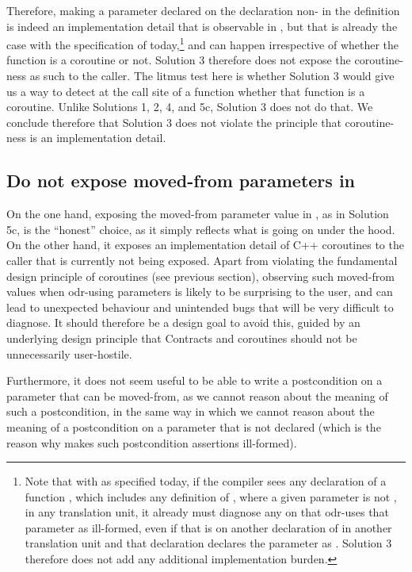 Therefore, making a parameter declared  on the declaration non- in the definition is indeed an implementation detail that is observable in , but that is already the case with the specification of \cite{P2900R8} today,\footnote{Note that with \cite{P2900R8} as specified today, if the compiler sees any declaration of a function , which includes any definition of , where a given parameter is not , in any translation unit, it already must diagnose any  on  that odr-uses that parameter as ill-formed, even if that  is on another declaration of  in another translation unit and that declaration declares the parameter as . Solution 3 therefore does not add any additional implementation burden.} and can happen irrespective of whether the function is a coroutine or not. Solution 3 therefore does not expose the coroutine-ness as such to the caller. The litmus test here is whether Solution 3 would give us a way to detect at the call site of a function whether that function is a coroutine. Unlike Solutions 1, 2, 4, and 5c, Solution 3 does not do that. We conclude therefore that Solution 3 does not violate the principle that coroutine-ness is an implementation detail.

\subsection{Do not expose moved-from parameters in }

On the one hand, exposing the moved-from parameter value in , as in Solution 5c, is the ``honest'' choice, as it simply reflects what is going on under the hood. On the other hand, it exposes an implementation detail of C++ coroutines to the caller that is currently not being exposed. Apart from violating the fundamental design principle of coroutines (see previous section), observing such moved-from values when odr-using  parameters is likely to be surprising to the user, and can lead to unexpected behaviour and unintended bugs that will be very difficult to diagnose. It should therefore be a design goal to avoid this, guided by an underlying design principle that Contracts and coroutines should not be unnecessarily user-hostile.

Furthermore, it does not seem useful to be able to write a postcondition on a parameter that can be moved-from, as we cannot reason about the meaning of such a postcondition, in the same way in which we cannot reason about the meaning of a postcondition on a parameter that is not declared  (which is the reason why \cite{P2900R8} makes such postcondition assertions ill-formed).

